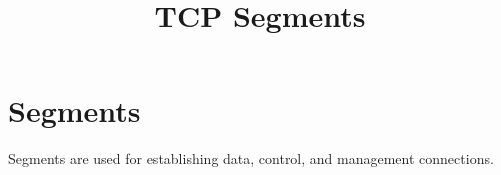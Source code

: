 \documentclass{article}
\title{TCP Segments}
\begin{document}
\section*{Segments}
Segments are used for establishing data, control, and management connections.
\end{document}
